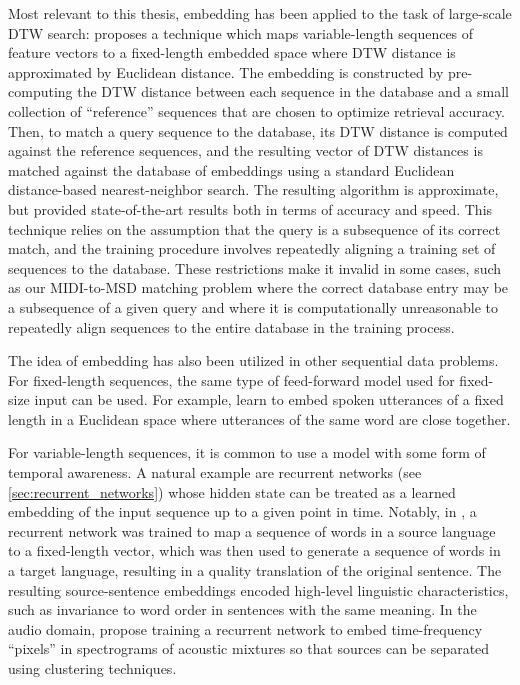 Most relevant to this thesis, embedding has been applied to the task of large-scale DTW search: \cite{papapetrou2011embedding} proposes a technique which maps variable-length sequences of feature vectors to a fixed-length embedded space where DTW distance is approximated by Euclidean distance.
The embedding is constructed by pre-computing the DTW distance between each sequence in the database and a small collection of ``reference'' sequences that are chosen to optimize retrieval accuracy.
Then, to match a query sequence to the database, its DTW distance is computed against the reference sequences, and the resulting vector of DTW distances is matched against the database of embeddings using a standard Euclidean distance-based nearest-neighbor search.
The resulting algorithm is approximate, but provided state-of-the-art results both in terms of accuracy and speed.
This technique relies on the assumption that the query is a subsequence of its correct match, and the training procedure involves repeatedly aligning a training set of sequences to the database.
These restrictions make it invalid in some cases, such as our MIDI-to-MSD matching problem where the correct database entry may be a subsequence of a given query and where it is computationally unreasonable to repeatedly align sequences to the entire database in the training process.

The idea of embedding has also been utilized in other sequential data problems.
For fixed-length sequences, the same type of feed-forward model used for fixed-size input can be used.
For example, \cite{kamper2016deep,bengio2014word} learn to embed spoken utterances of a fixed length in a Euclidean space where utterances of the same word are close together.

For variable-length sequences, it is common to use a model with some form of temporal awareness.
A natural example are recurrent networks (see \cref{sec:recurrent_networks}) whose hidden state can be treated as a learned embedding of the input sequence up to a given point in time.
Notably, in \cite{sutskever2014sequence}, a recurrent network was trained to map a sequence of words in a source language to a fixed-length vector, which was then used to generate a sequence of words in a target language, resulting in a quality translation of the original sentence.
The resulting source-sentence embeddings encoded high-level linguistic characteristics, such as invariance to word order in sentences with the same meaning.
In the audio domain, \cite{hershey2016deep} propose training a recurrent network to embed time-frequency ``pixels'' in spectrograms of acoustic mixtures so that sources can be separated using clustering techniques.

